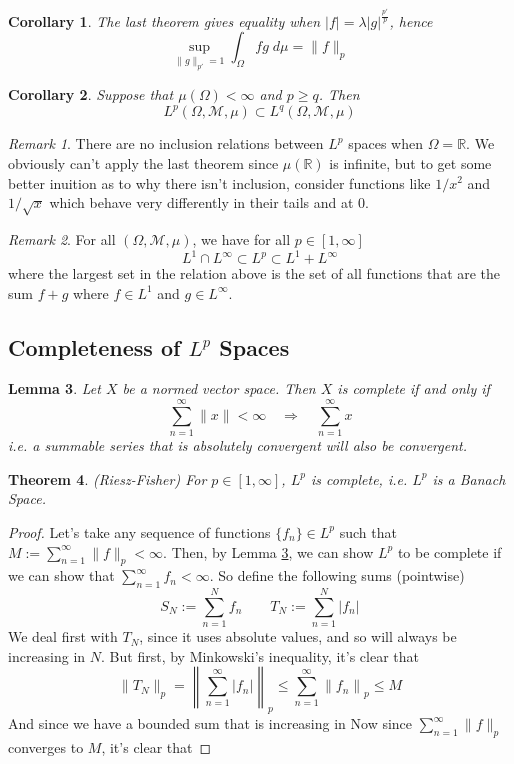 \documentclass[12pt]{article}
\theoremstyle{plain}
\newtheorem{thm}{Theorem}[subsection]
\newtheorem{lem}[thm]{Lemma}
\newtheorem{cor}[thm]{Corollary}
\theoremstyle{definition}
\theoremstyle{remark}
\newtheorem*{rmk}{Remark}
\begin{document}
\begin{cor}
The last theorem gives equality when $|f|=\lambda |g|^{\frac{p'}{p}}$, hence 
\[
    \sup_{\lVert g\rVert_{p'}=1} 
    \int_\Omega fg \; d\mu = \lVert f\rVert_p
\]
\end{cor}

\begin{cor}
Suppose that $\mu(\Omega)<\infty$ and $p\geq q$. Then 
\[
    L^p(\Omega,\mathscr{M},\mu)
    \subset 
    L^q(\Omega,\mathscr{M},\mu)
\]
\end{cor}
\begin{rmk}
There are no inclusion relations between $L^p$ spaces when $\Omega=\mathbb{R}$. We obviously can't apply the last theorem since $\mu(\mathbb{R})$ is infinite, but to get some better inuition as to why there isn't inclusion, consider functions like $1/x^2$ and $1/\sqrt{x}$ which behave very differently in their tails and at $0$. 
\end{rmk}

\begin{rmk}
    For all $(\Omega,\mathscr{M},\mu)$, we have for all $p\in[1,\infty]$
\[
    L^1 \cap L^\infty \subset L^p \subset L^1+L^\infty
\]
where the largest set in the relation above is the set of all functions that are the sum $f+g$ where $f\in L^1$ and $g\in L^\infty$.
\end{rmk}


\subsection{Completeness of $L^p$ Spaces}

\begin{lem}
\label{lem.absonv}
Let $X$ be a normed vector space. Then $X$ is complete if and only if 
\[
    \sum^\infty_{n=1} \lVert x\rVert < \infty
    \quad\Rightarrow\quad
    \sum^\infty_{n=1}  x
\]
i.e. a summable series that is \emph{absolutely} convergent will also be convergent.
\end{lem}

\begin{thm}
(Riesz-Fisher) For $p\in[1,\infty]$, $L^p$ is complete, i.e. $L^p$ is a Banach Space.
\end{thm}
\begin{proof}
Let's take any sequence of functions $\{f_n\}\in L^p$ such that $M:=\sum^\infty_{n=1} \lVert f\rVert_p<\infty$. Then, by Lemma \ref{lem.absonv}, we can show $L^p$ to be complete if we can show that $\sum^\infty_{n=1} f_n <\infty$.  So define the following sums (pointwise)
\[
    S_N:=\sum^N_{n=1} f_n
    \qquad 
    T_N:=\sum^N_{n=1} |f_n|
\]
We deal first with $T_N$, since it uses absolute values, and so will always be increasing in $N$. But first, by Minkowski's inequality, it's clear that 
\[
    \lVert T_N \rVert_p =  
    \left\lVert \sum^\infty_{n=1} |f_n|
    \right\rVert_p \leq
    \sum^\infty_{n=1} \left\lVert f_n
    \right\rVert_p \leq
    M
\]
And since we have a bounded sum that is increasing in 
Now since $\sum^\infty_{n=1}\lVert f\rVert_p$ converges to $M$, it's clear that 
\end{proof}
\end{document}
